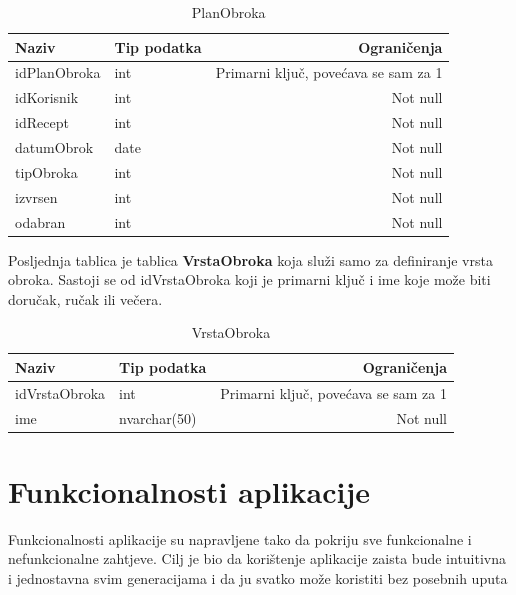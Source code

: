 \documentclass[diplomskirad]{fer}
\begin{document}
\begin{table}[H]
\label{tbl:PlanObroka}
\centering
\renewcommand{\arraystretch}{1.3}
\begin{tabular}{llr} \hline
Naziv & Tip podatka & Ograničenja\\ \hline
idPlanObroka & int & Primarni ključ, povećava se sam za 1 \\
idKorisnik & int & Not null\\
idRecept & int & Not null\\
datumObrok & date & Not null\\
tipObroka & int & Not null\\
izvrsen & int & Not null\\
odabran & int & Not null\\
\end{tabular}
\caption{PlanObroka}
\end{table}

Posljednja tablica je tablica \textbf{VrstaObroka} koja služi samo za definiranje vrsta obroka. Sastoji se od idVrstaObroka koji je primarni ključ i ime koje može biti doručak, ručak ili večera.

\begin{table}[H]
\label{tbl:VrstaObroka}
\centering
\renewcommand{\arraystretch}{1.3}
\begin{tabular}{llr} \hline
Naziv & Tip podatka & Ograničenja\\ \hline
idVrstaObroka & int & Primarni ključ, povećava se sam za 1 \\
ime & nvarchar(50) & Not null\\
\end{tabular}
\caption{VrstaObroka}
\end{table}









\section{Funkcionalnosti aplikacije}
Funkcionalnosti aplikacije su napravljene tako da pokriju sve funkcionalne i nefunkcionalne zahtjeve. Cilj je bio da korištenje aplikacije zaista bude intuitivna i jednostavna svim generacijama i da ju svatko može koristiti bez posebnih uputa
\end{document}

